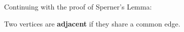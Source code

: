 
Continuing with the proof of Sperner's Lemma:

\begin{definition}
	Two vertices are \textbf{adjacent} if they share a common edge.
\end{definition}

\begin{replacementproof}
	
\end{replacementproof}
